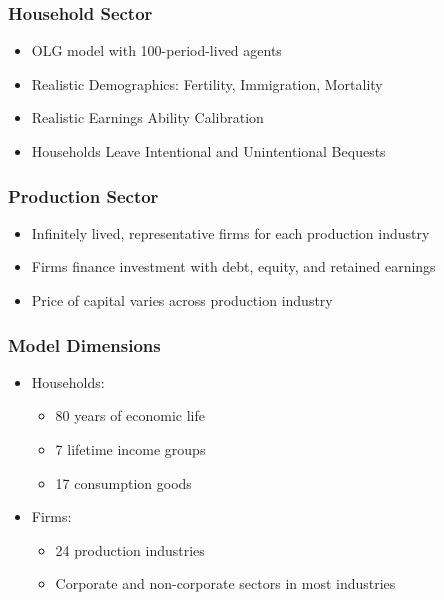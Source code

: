 \documentclass{beamer}
\begin{document}
    \begin{frame}
    \frametitle{Household Sector}
    \begin{itemize}
      \item OLG model with 100-period-lived agents
      \item Realistic Demographics: Fertility, Immigration, Mortality
      \item Realistic Earnings Ability Calibration
      \item Households Leave Intentional and Unintentional Bequests
    \end{itemize}
  \end{frame}


      \begin{frame}
    \frametitle{Production Sector}
    \begin{itemize}
      \item Infinitely lived, representative firms for each production industry
      \item Firms finance investment with debt, equity, and retained earnings
      \item Price of capital varies across production industry
    \end{itemize}
  \end{frame}

   \begin{frame}
    \frametitle{Model Dimensions}
    \begin{itemize}
      \item Households:
      		\begin{itemize}
		\item 80 years of economic life
		\item 7 lifetime income groups
		\item 17 consumption goods
		\end{itemize}
      \item Firms:
      	\begin{itemize}
	\item 24 production industries
	\item Corporate and non-corporate sectors in most industries
	\end{itemize}
    \end{itemize}
  \end{frame}
\end{document}
